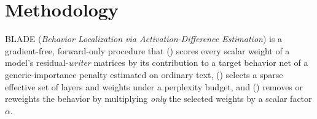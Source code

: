 \section{Methodology}
\label{sec:method}

BLADE (\emph{Behavior Localization via Activation-Difference Estimation}) is a gradient-free, forward-only procedure that (\textit{}) scores every scalar weight of a model's residual-\emph{writer} matrices by its contribution to a target behavior net of a generic-importance penalty estimated on ordinary text, (\textit{}) selects a sparse effective set of layers and weights under a perplexity budget, and (\textit{}) removes or reweights the behavior by multiplying \emph{only} the selected weights by a scalar factor $\alpha$. %


